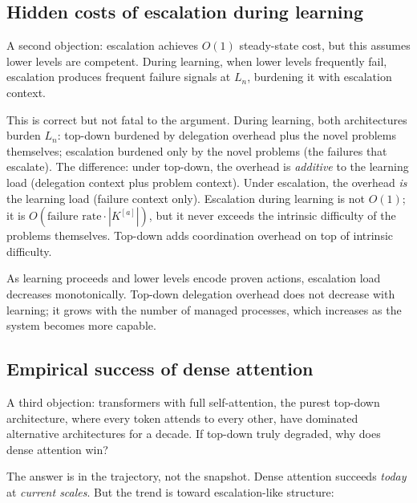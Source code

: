 \documentclass[11pt]{article}
\theoremstyle{definition}
\begin{document}
\subsection{Hidden costs of escalation during learning}

A second objection: escalation achieves $O(1)$ steady-state cost, but
this assumes lower levels are competent. During learning, when lower
levels frequently fail, escalation produces frequent failure signals
at $L_n$, burdening it with escalation context.

This is correct but not fatal to the argument. During learning, both
architectures burden $L_n$: top-down burdened by delegation overhead
plus the novel problems themselves; escalation burdened only by the
novel problems (the failures that escalate). The difference: under
top-down, the overhead is \emph{additive} to the learning load
(delegation context plus problem context). Under escalation, the
overhead \emph{is} the learning load (failure context only). Escalation
during learning is not $O(1)$; it is $O(\text{failure rate} \cdot
|K^{[a]}|)$, but it never exceeds the intrinsic difficulty of the
problems themselves. Top-down adds coordination overhead on top of
intrinsic difficulty.

As learning proceeds and lower levels encode proven actions, escalation
load decreases monotonically. Top-down delegation overhead does not
decrease with learning; it grows with the number of managed processes,
which increases as the system becomes more capable.

\subsection{Empirical success of dense attention}

A third objection: transformers with full self-attention, the purest
top-down architecture, where every token attends to every other, have
dominated alternative architectures for a decade. If top-down truly
degraded, why does dense attention win?

The answer is in the trajectory, not the snapshot. Dense attention
succeeds \emph{today} at \emph{current scales}. But the trend is
toward escalation-like structure:
\end{document}
